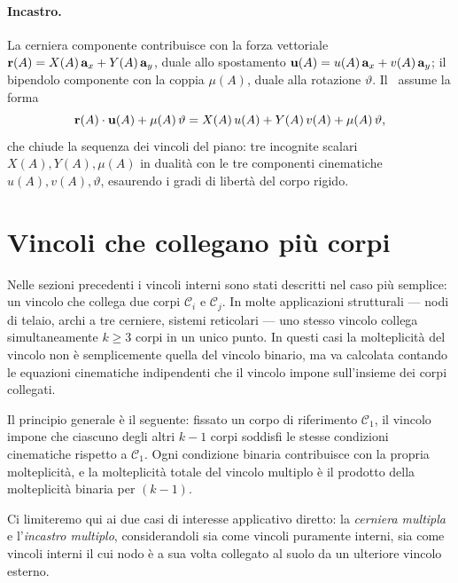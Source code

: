 \paragraph{Incastro.}
La cerniera componente contribuisce con la forza
vettoriale $\mathbf{r}(A) = X(A)\,\mathbf{a}_x + Y(A)\,\mathbf{a}_y$, duale
allo spostamento $\mathbf{u}(A) = u(A)\,\mathbf{a}_x + v(A)\,\mathbf{a}_y$;
il bipendolo componente con la coppia $\mu(A)$, duale
alla rotazione $\vartheta$. Il \PLV\ assume la forma
\begin{equation}\label{eq:lavoro_incastro}
	\mathbf{r}(A) \cdot \mathbf{u}(A) + \mu(A)\,\vartheta
	= X(A)\,u(A) + Y(A)\,v(A) + \mu(A)\,\vartheta,
\end{equation}
che chiude la sequenza dei vincoli del piano: tre
incognite scalari $X(A), Y(A), \mu(A)$ in dualità con
le tre componenti cinematiche $u(A), v(A), \vartheta$,
esaurendo i gradi di libertà del corpo rigido.



\section{Vincoli che collegano più corpi}\label{sec:vincoli_multipli}

Nelle sezioni precedenti i vincoli interni sono stati
descritti nel caso più semplice: un vincolo che collega
due corpi $\mathcal{C}_i$ e $\mathcal{C}_j$. In molte
applicazioni strutturali --- nodi di telaio, archi a tre
cerniere, sistemi reticolari --- uno stesso vincolo collega
simultaneamente $k \geq 3$ corpi in un unico punto. In
questi casi la molteplicità del vincolo non è semplicemente
quella del vincolo binario, ma va calcolata contando le
equazioni cinematiche indipendenti che il vincolo impone
sull'insieme dei corpi collegati.

Il principio generale è il seguente: fissato un corpo di
riferimento $\mathcal{C}_1$, il vincolo impone che ciascuno
degli altri $k-1$ corpi soddisfi le stesse condizioni
cinematiche rispetto a $\mathcal{C}_1$. Ogni condizione
binaria contribuisce con la propria molteplicità, e la
molteplicità totale del vincolo multiplo è il prodotto
della molteplicità binaria per $(k-1)$.

Ci limiteremo qui ai due casi di interesse applicativo
diretto: la \emph{cerniera multipla} e l'\emph{incastro
	multiplo}, considerandoli sia come vincoli puramente
interni, sia come vincoli interni il cui nodo è a sua
volta collegato al suolo da un ulteriore vincolo esterno.

